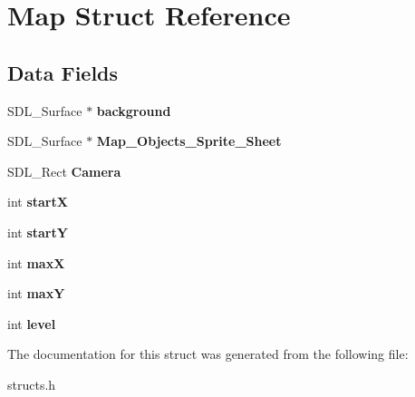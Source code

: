 \hypertarget{structMap}{}\section{Map Struct Reference}
\label{structMap}
\subsection*{Data Fields}
\begin{DoxyCompactItemize}
\item 
\mbox{\label{structMap_a4e5b5f8caa592075319b99fc221669da}} 
S\+D\+L\+\_\+\+Surface $\ast$ {\bfseries background}
\item 
\mbox{\label{structMap_a0d619f368771e787afd08cd2acb44668}} 
S\+D\+L\+\_\+\+Surface $\ast$ {\bfseries Map\+\_\+\+Objects\+\_\+\+Sprite\+\_\+\+Sheet}
\item 
\mbox{\label{structMap_a8e17b6ae3d7dc1caebc54a8cf6671bcc}} 
S\+D\+L\+\_\+\+Rect {\bfseries Camera}
\item 
\mbox{\label{structMap_aec09a812761311faef72bd6aae7eb586}} 
int {\bfseries startX}
\item 
\mbox{\label{structMap_a0d8a9a37385dbb4c831b61f72af82081}} 
int {\bfseries startY}
\item 
\mbox{\label{structMap_aedd73d1e84a7b38af317cf066b5c9204}} 
int {\bfseries maxX}
\item 
\mbox{\label{structMap_adb307add6076311e6fea122875955d5f}} 
int {\bfseries maxY}
\item 
\mbox{\label{structMap_a11a45c46c908eabf247382acf9866d70}} 
int {\bfseries level}
\end{DoxyCompactItemize}


The documentation for this struct was generated from the following file\+:\begin{DoxyCompactItemize}
\item 
structs.\+h\end{DoxyCompactItemize}
